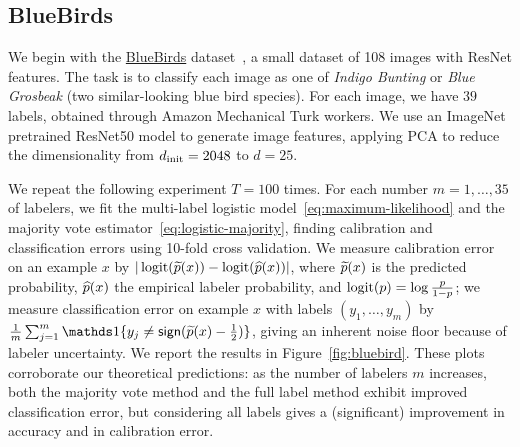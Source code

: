


\subsection{BlueBirds}
\label{sec:BB}

We begin with the
\href{https://github.com/eaplatanios/noisy-labels}{BlueBirds}
dataset~\cite{WelinderBrPeBe10}, a small dataset of 108 images with ResNet features.  The task is to classify each image as one of
\textit{Indigo Bunting} or \textit{Blue Grosbeak} (two similar-looking blue
bird species). For each image, we have $39$ labels, obtained through Amazon
Mechanical Turk workers.  We use an ImageNet pretrained
ResNet50 model to generate image
features, applying PCA to reduce the dimensionality from
$d_{\textup{init}} = 2048$ to $d=25$.

We repeat the following experiment $T = 100$ times.
%
For each number $m = 1, \ldots, 35$ of labelers, we fit
the multi-label logistic model~\eqref{eq:maximum-likelihood}
and the majority vote estimator~\eqref{eq:logistic-majority},
finding calibration and classification errors using 10-fold cross validation.
%
We measure calibration error on an example $x$
by $|\mathop{\rm logit}(\widetilde{p}(x)) -
\mathop{\rm logit}(\widehat{p}(x))|$, where $\widetilde{p}(x)$ is the predicted probability,
$\widehat{p}(x)$ the empirical labeler probability,
and $\mathop{\rm logit}(p) = \log\frac{p}{1 - p}$; we measure classification
error on example $x$ with
labels $(y_1, \ldots, y_m)$ by $\frac{1}{m} \sum_{j = 1}^m \ind\{y_j \neq
\sgn(\wt{p}(x) - \half)\}$, giving an inherent noise floor because
of labeler uncertainty. We
report the results in Figure~\ref{fig:bluebird}.
These plots corroborate
our theoretical predictions: as the number of labelers $m$ increases, both
the majority vote method and the full label method exhibit improved
classification error, but considering all labels gives a (significant)
improvement in accuracy and in calibration error.


